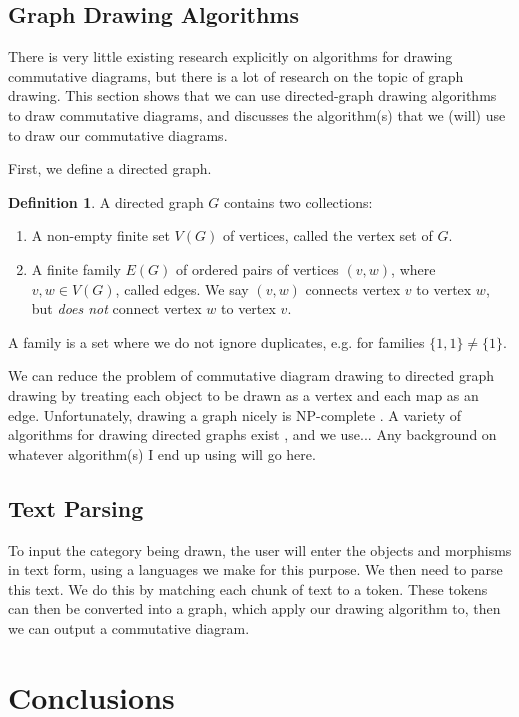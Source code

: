\documentclass[logo,bsc,singlespacing,parskip]{infthesis}
\theoremstyle{definition}
\newtheorem{defn}[prop]{Definition}
\begin{document}
\section{Graph Drawing Algorithms}\label{bkg:graph-draw}
There is very little existing research explicitly on algorithms for drawing commutative diagrams, but there is a lot of research on the topic of graph drawing. This section shows that we can use directed-graph drawing algorithms to draw commutative diagrams, and discusses the algorithm(s) that we (will) use to draw our commutative diagrams.

First, we define a directed graph.
\begin{defn}
    A directed graph $G$ contains two collections:
    \begin{enumerate}
        \item A non-empty finite set $V(G)$ of vertices, called the vertex set of $G$.
        \item A finite family $E(G)$ of ordered pairs of vertices $(v,w)$, where $v, w \in V(G)$, called edges. We say $(v,w)$ connects vertex $v$ to vertex $w$, but \emph{does not} connect vertex $w$ to vertex $v$.
    \end{enumerate}
\end{defn}
 A family is a set where we do not ignore duplicates, e.g. for families $\{1, 1\} \ne \{1\}$.

We can reduce the problem of commutative diagram drawing to directed graph drawing by treating each object to be drawn as a vertex and each map as an edge.
Unfortunately, drawing a graph nicely is NP-complete \cite{10.1007/3-540-52698-6_1}. A variety of algorithms for drawing directed graphs exist \cite{di1994algorithms}, and we use... Any background on whatever algorithm(s) I end up using will go here.


\section{Text Parsing}\label{bkg:text-parse}
To input the category being drawn, the user will enter the objects and morphisms in text form, using a languages we make for this purpose. We then need to parse this text. We do this by matching each chunk of text to a token. These tokens can then be converted into a graph, which apply our drawing algorithm to, then we can output a commutative diagram.

\chapter{Conclusions}
\end{document}
